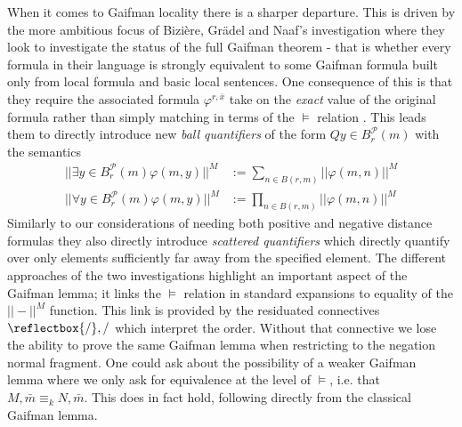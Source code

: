 \documentclass{lmcs} %
\newcommand{\?}{\ensuremath{\mkern0.4\thinmuskip}}
\newcommand{\und}{\mathord{\reflectbox{/}}}%
\let\phi=\varphi
\newcommand{\CP}{\mathcal{P}}
\begin{document}
When it comes to Gaifman locality there is a sharper departure. This is driven by the more ambitious focus of Bizi\`{e}re, Gr\"{a}del and Naaf's investigation where they look to investigate the status of the full Gaifman theorem - that is whether every formula in their language is strongly equivalent to some Gaifman formula built only from local formula and basic local sentences. One consequence of this is that they require the associated formula $\phi^{r,\bar{x}}$ take on the \textit{exact} value of the original formula rather than simply matching in terms of the $\models$ relation \cite[Appendix A]{BiziereGradelNaaf23:Localitysemiring}. This leads them to directly introduce new \textit{ball quantifiers} of the form $Qy\in B^{\CP}_{r}(m)$ with the semantics \begin{align*}
    ||\exists y\in B^{\CP}_{r}(m)\phi(m,y)||^M&:=\sum\limits_{n\in B(r,m)}||\phi(m,n)||^M\\ 
    ||\forall y\in B^{\CP}_{r}(m)\phi(m,y)||^M&:=\prod\limits_{n\in B(r,m)}||\phi(m,n)||^M
\end{align*}
Similarly to our considerations of needing both positive and negative distance formulas they also directly introduce \textit{scattered quantifiers} which directly quantify over only elements sufficiently far away from the specified element. The different approaches of the two investigations highlight an important aspect of the Gaifman lemma; it links the $\models$ relation in standard expansions to equality of the $||-||^M$ function. This link is provided by the residuated connectives $\und,/$ which interpret the order. Without that connective we lose the ability to prove the same Gaifman lemma when restricting to the negation normal fragment. One could ask about the possibility of a weaker Gaifman lemma where we only ask for equivalence at the level of $\models$, i.e. that $M,\bar{m}\equiv_k N,\bar{m}$. This does in fact hold, following directly from the classical Gaifman lemma.
\end{document}
